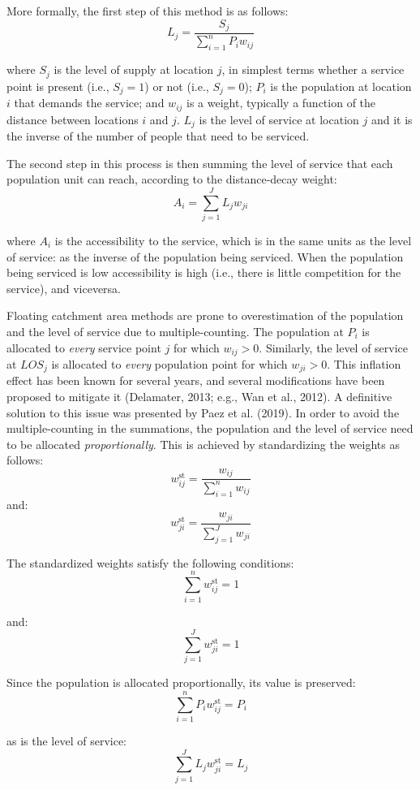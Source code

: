 \documentclass[]{elsarticle} %
\begin{document}
More formally, the first step of this method is as follows: \[
L_j = \frac{S_j}{\sum_{i=1}^nP_iw_{ij}}
\]

\noindent where \(S_j\) is the level of supply at location \(j\), in
simplest terms whether a service point is present (i.e., \(S_j=1\)) or
not (i.e., \(S_j=0\)); \(P_i\) is the population at location \(i\) that
demands the service; and \(w_{ij}\) is a weight, typically a function of
the distance between locations \(i\) and \(j\). \(L_j\) is the level of
service at location \(j\) and it is the inverse of the number of people
that need to be serviced.

The second step in this process is then summing the level of service
that each population unit can reach, according to the distance-decay
weight: \[
A_i = \sum_{j=1}^JL_jw_{ji}
\]

\noindent where \(A_i\) is the accessibility to the service, which is in
the same units as the level of service: as the inverse of the population
being serviced. When the population being serviced is low accessibility
is high (i.e., there is little competition for the service), and
viceversa.

Floating catchment area methods are prone to overestimation of the
population and the level of service due to multiple-counting. The
population at \(P_i\) is allocated to \emph{every} service point \(j\)
for which \(w_{ij}>0\). Similarly, the level of service at \(LOS_j\) is
allocated to \emph{every} population point for which \(w_{ji}>0\). This
inflation effect has been known for several years, and several
modifications have been proposed to mitigate it (Delamater, 2013; e.g.,
Wan et al., 2012). A definitive solution to this issue was presented by
Paez et al. (2019). In order to avoid the multiple-counting in the
summations, the population and the level of service need to be allocated
\emph{proportionally}. This is achieved by standardizing the weights as
follows: \[
w_{ij}^\text{st} = \frac{w_{ij}}{\sum_{i=1}^nw_{ij}}
\] \noindent and: \[
w_{ji}^\text{st} = \frac{w_{ji}}{\sum_{j=1}^Jw_{ji}}
\]

The standardized weights satisfy the following conditions: \[
\sum_{i=1}^nw_{ij}^\text{st}=1
\]

\noindent and: \[
\sum_{j=1}^Jw_{ji}^\text{st}=1
\]

Since the population is allocated proportionally, its value is
preserved: \[
\sum_{i=1}^nP_iw_{ij}^\text{st}=P_i
\]

\noindent as is the level of service: \[
\sum_{j=1}^JL_jw_{ji}^\text{st}=L_j
\]
\end{document}
